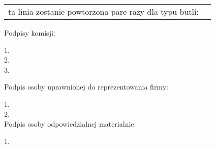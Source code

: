 \documentclass[8pt]{article}
\begin{document}
\begin{center}

\begin{tabularx}{\textwidth}{| X | c |}

\hline

ta linia zostanie powtorzona pare razy dla typu butli: %

\end{tabularx}

\end{center}

\begin{multicols}{2}

Podpisy komisji:

1. \dotfill \\


2. \dotfill \\


3. \dotfill \\

\columnbreak

Podpis osoby uprawnionej do reprezentowania firmy:

1. \dotfill \\


2. \dotfill \\

Podpis osoby odpowiedzialnej materialnie:

1. \dotfill \\

\end{multicols}
\end{document}
